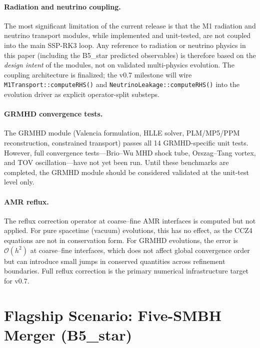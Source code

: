 \documentclass[aps,prd,twocolumn,superscriptaddress,nofootinbib,showpacs,
               longbibliography]{revtex4-2}
\newcommand{\code}[1]{\texttt{#1}}
\newcommand{\order}[1]{\mathcal{O}(#1)}
\begin{document}
\paragraph{Radiation and neutrino coupling.}
The most significant limitation of the current release is that the M1
radiation and neutrino transport modules, while implemented and unit-tested,
are not coupled into the main SSP-RK3 loop.
Any reference to radiation or neutrino physics in this paper (including the
B5\_star predicted observables) is therefore based on the \emph{design intent}
of the modules, not on validated multi-physics evolution.
The coupling architecture is finalized; the v0.7 milestone will wire
\code{M1Transport::computeRHS()} and \code{NeutrinoLeakage::computeRHS()}
into the evolution driver as explicit operator-split substeps.

\paragraph{GRMHD convergence tests.}
The GRMHD module (Valencia formulation, HLLE solver, PLM/MP5/PPM
reconstruction, constrained transport) passes all 14 GRMHD-specific unit
tests.
However, full convergence tests---Brio--Wu MHD shock tube, Orszag--Tang
vortex, and TOV oscillation---have not yet been run.
Until these benchmarks are completed, the GRMHD module should be considered
validated at the unit-test level only.

\paragraph{AMR reflux.}
The reflux correction operator at coarse--fine AMR interfaces is computed
but not applied.
For pure spacetime (vacuum) evolutions, this has no effect, as the CCZ4
equations are not in conservation form.
For GRMHD evolutions, the error is $\order{h^2}$ at coarse--fine interfaces,
which does not affect global convergence order but can introduce small
jumps in conserved quantities across refinement boundaries.
Full reflux correction is the primary numerical infrastructure target for v0.7.

\section{Flagship Scenario: Five-SMBH Merger (B5\_star)}
\label{sec:flagship}
\end{document}
